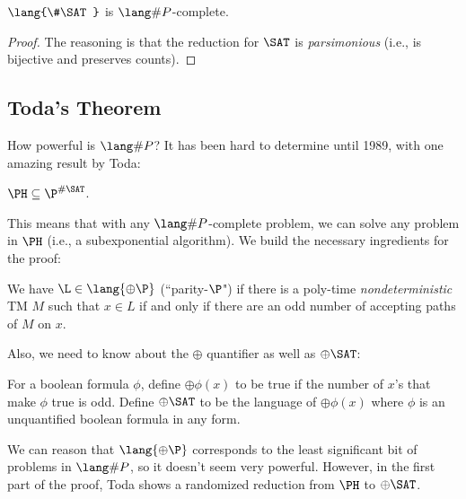 \newcommand{\SharpSAT}{\lang{\#\SAT}}
\begin{theorem}
$\SharpSAT$ is $\SharpP$-complete.
\end{theorem}

\begin{proof}
The reasoning is that the reduction for $\SAT$ is \emph{parsimonious} (i.e., is bijective and preserves counts). 
\end{proof}

\subsection{Toda's Theorem}
How powerful is $\SharpP$? It has been hard to determine until 1989, with one amazing result by Toda:
\begin{theorem}
$\PH \subseteq \P^{\#\SAT}$. 
\end{theorem}
This means that with any $\SharpP$-complete problem, we can solve any problem in $\PH$ (i.e., a subexponential algorithm). We build the necessary ingredients for the proof:

\newcommand{\Parity}{\oplus}
\newcommand{\ParityP}{\lang{\Parity\P}}
\begin{definition}
We have $\L \in \ParityP$ (``parity-$\P$") if there is a poly-time \emph{nondeterministic} TM $M$ such that $x \in L$ if and only if there are an odd number of accepting paths of $M$ on $x$. 
\end{definition}
\newcommand{\ParitySAT}{\Parity\SAT}
Also, we need to know about the $\Parity$ quantifier as well as $\ParitySAT$:
\begin{definition}
For a boolean formula $\phi$, define $\Parity\phi(x)$ to be true if the number of $x$'s that make $\phi$ true is odd. Define $\ParitySAT$ to be the language of $\Parity\phi(x)$ where $\phi$ is an unquantified boolean formula in any form.
\end{definition}
We can reason that $\ParityP$ corresponds to the least significant bit of problems in $\SharpP$, so it doesn't seem very powerful. However, in the first part of the proof, Toda shows a randomized reduction from $\PH$ to $\ParitySAT$. 
